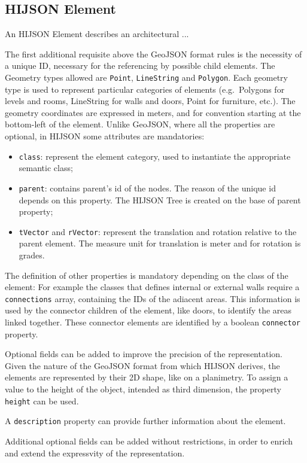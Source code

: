 \subsection{HIJSON Element}

An HIJSON Element describes an architectural ...

The first additional requisite above the GeoJSON format rules is the
necessity of a unique ID, necessary for the referencing by possible
child elements. The Geometry types allowed are \texttt{Point},
\texttt{LineString} and \texttt{Polygon}. Each geometry type is used to
represent particular categories of elements (e.g.~Polygons for levels
and rooms, LineString for walls and doors, Point for furniture, etc.).
The geometry coordinates are expressed in meters, and for convention
starting at the bottom-left of the element. Unlike GeoJSON, where all
the properties are optional, in HIJSON some attributes are mandatories:

\begin{itemize}
\itemsep1pt\parskip0pt
\item
 \texttt{class}: represent the element category, used to instantiate
 the appropriate semantic class;
\item
 \texttt{parent}: contains parent's id of the nodes. The reason of the
 unique id depends on this property. The HIJSON Tree is created on the
 base of parent property;
\item
 \texttt{tVector} and \texttt{rVector}: represent the translation and
 rotation relative to the parent element. The measure unit for
 translation is meter and for rotation is grades.
\end{itemize}

The definition of other properties is mandatory depending on the class
of the element: For example the classes that defines internal or
external walls require a \texttt{connections} array, containing the IDs
of the adiacent areas. This information is used by the connector
children of the element, like doors, to identify the areas linked
together. These connector elements are identified by a
boolean \texttt{connector} property.

Optional fields can be added to improve the precision of the
representation. Given the nature of the GeoJSON format from which HIJSON
derives, the elements are represented by their 2D shape, like on a
planimetry. To assign a value to the height of the object, intended as
third dimension, the property \texttt{height} can be used.

A \texttt{description} property can provide further information about
the element.

Additional optional fields can be added without restrictions, in order  to
enrich and extend the expressvity of the representation.
